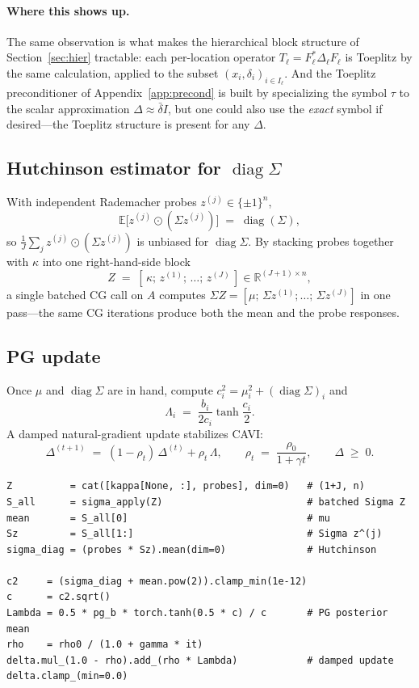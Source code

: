 \documentclass{article}
\newcommand{\R}{\mathbb{R}}
\newcommand{\E}{\mathbb{E}}
\DeclareMathOperator{\diag}{diag}
\begin{document}
\paragraph{Where this shows up.}
The same observation is what makes the hierarchical block structure of Section~\ref{sec:hier} tractable: each per-location operator $T_\ell=F_\ell^{*}\Delta_\ell F_\ell$ is Toeplitz by the same calculation, applied to the subset $(x_i,\delta_i)_{i\in I_\ell}$. And the Toeplitz preconditioner of Appendix~\ref{app:precond} is built by specializing the symbol $\tau$ to the scalar approximation $\Delta\approx\bar\delta I$, but one could also use the \emph{exact} symbol if desired---the Toeplitz structure is present for any $\Delta$.

\subsection{Hutchinson estimator for $\diag\Sigma$}
With independent Rademacher probes $z^{(j)}\in\{\pm1\}^{n}$,
\[
  \E\!\bigl[z^{(j)}\odot(\Sigma z^{(j)})\bigr] \;=\; \diag(\Sigma),
\]
so $\tfrac{1}{J}\sum_j z^{(j)}\odot(\Sigma z^{(j)})$ is unbiased for $\diag\Sigma$. By stacking probes together with $\kappa$ into one right-hand-side block
\[
  Z \;=\; [\,\kappa;\, z^{(1)};\,\ldots;\,z^{(J)}\,]\in\R^{(J+1)\times n},
\]
a single batched CG call on $A$ computes $\Sigma Z=[\mu;\,\Sigma z^{(1)};\ldots;\,\Sigma z^{(J)}]$ in one pass---the same CG iterations produce both the mean and the probe responses.

\subsection{PG update}
Once $\mu$ and $\diag\Sigma$ are in hand, compute $c_i^{2}=\mu_i^{2}+(\diag\Sigma)_i$ and
\[
  \Lambda_i \;=\; \frac{b_i}{2c_i}\tanh\!\frac{c_i}{2}.
\]
A damped natural-gradient update stabilizes CAVI:
\[
  \Delta^{(t+1)} \;=\; (1-\rho_t)\,\Delta^{(t)} + \rho_t\,\Lambda,
  \qquad
  \rho_t \;=\; \frac{\rho_0}{1+\gamma t},
  \qquad \Delta \;\ge\; 0.
\]

\begin{lstlisting}
Z          = cat([kappa[None, :], probes], dim=0)   # (1+J, n)
S_all      = sigma_apply(Z)                         # batched Sigma Z
mean       = S_all[0]                               # mu
Sz         = S_all[1:]                              # Sigma z^(j)
sigma_diag = (probes * Sz).mean(dim=0)              # Hutchinson

c2     = (sigma_diag + mean.pow(2)).clamp_min(1e-12)
c      = c2.sqrt()
Lambda = 0.5 * pg_b * torch.tanh(0.5 * c) / c       # PG posterior mean
rho    = rho0 / (1.0 + gamma * it)
delta.mul_(1.0 - rho).add_(rho * Lambda)            # damped update
delta.clamp_(min=0.0)
\end{lstlisting}
\end{document}
